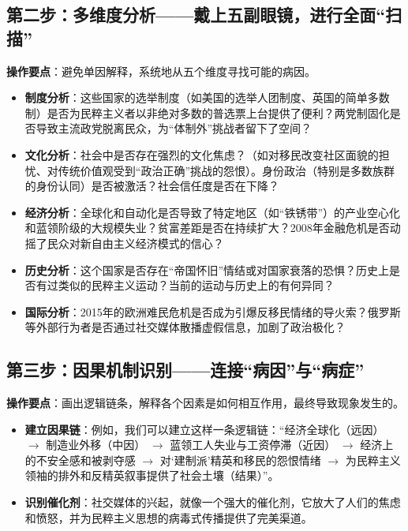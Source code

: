\subsection{第二步：多维度分析——戴上五副眼镜，进行全面“扫描”}
\textbf{操作要点}：避免单因解释，系统地从五个维度寻找可能的病因。
\begin{itemize}
    \item \textbf{制度分析}：这些国家的选举制度（如美国的选举人团制度、英国的简单多数制）是否为民粹主义者以非绝对多数的普选票上台提供了便利？两党制固化是否导致主流政党脱离民众，为“体制外”挑战者留下了空间？
    \item \textbf{文化分析}：社会中是否存在强烈的文化焦虑？（如对移民改变社区面貌的担忧、对传统价值观受到“政治正确”挑战的怨恨）。身份政治（特别是多数族群的身份认同）是否被激活？社会信任度是否在下降？
    \item \textbf{经济分析}：全球化和自动化是否导致了特定地区（如“铁锈带”）的产业空心化和蓝领阶级的大规模失业？贫富差距是否在持续扩大？2008年金融危机是否动摇了民众对新自由主义经济模式的信心？
    \item \textbf{历史分析}：这个国家是否存在“帝国怀旧”情结或对国家衰落的恐惧？历史上是否有过类似的民粹主义运动？当前的运动与历史上的有何异同？
    \item \textbf{国际分析}：2015年的欧洲难民危机是否成为引爆反移民情绪的导火索？俄罗斯等外部行为者是否通过社交媒体散播虚假信息，加剧了政治极化？
\end{itemize}

\subsection{第三步：因果机制识别——连接“病因”与“病症”}
\textbf{操作要点}：画出逻辑链条，解释各个因素是如何相互作用，最终导致现象发生的。
\begin{itemize}
    \item \textbf{建立因果链}：例如，我们可以建立这样一条逻辑链：“经济全球化（远因） $\rightarrow$ 制造业外移（中因） $\rightarrow$ 蓝领工人失业与工资停滞（近因） $\rightarrow$ 经济上的不安全感和被剥夺感 $\rightarrow$ 对‘建制派’精英和移民的怨恨情绪 $\rightarrow$ 为民粹主义领袖的排外和反精英叙事提供了社会土壤（结果）”。
    \item \textbf{识别催化剂}：社交媒体的兴起，就像一个强大的催化剂，它放大了人们的焦虑和愤怒，并为民粹主义思想的病毒式传播提供了完美渠道。
\end{itemize}

